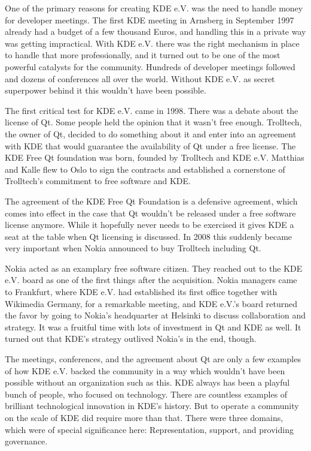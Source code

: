 One of the primary reasons for creating KDE e.V. was the need to handle money for developer meetings. The first KDE meeting in Arnsberg in September 1997 already had a budget of a few thousand Euros, and handling this in a private way was getting impractical. With KDE e.V. there was the right mechanism in place to handle that more professionally, and it turned out to be one of the most powerful catalysts for the community. Hundreds of developer meetings followed and dozens of conferences all over the world. Without KDE e.V. as secret superpower behind it this wouldn't have been possible.

The first critical test for KDE e.V. came in 1998. There was a debate about the license of Qt. Some people held the opinion that it wasn't free enough. Trolltech, the owner of Qt, decided to do something about it and enter into an agreement with KDE that would guarantee the availability of Qt under a free license. The KDE Free Qt foundation was born, founded by Trolltech and KDE e.V. Matthias and Kalle flew to Oslo to sign the contracts and established a cornerstone of Trolltech's commitment to free software and KDE.

The agreement of the KDE Free Qt Foundation is a defensive agreement, which comes into effect in the case that Qt wouldn't be released under a free software license anymore. While it hopefully never needs to be exercised it gives KDE a seat at the table when Qt licensing is discussed. In 2008 this suddenly became very important when Nokia announced to buy Trolltech including Qt.

Nokia acted as an examplary free software citizen. They reached out to the KDE e.V. board as one of the first things after the acquisition. Nokia managers came to Frankfurt, where KDE e.V. had established its first office together with Wikimedia Germany, for a remarkable meeting, and KDE e.V.'s board returned the favor by going to Nokia's headquarter at Helsinki to discuss collaboration and strategy. It was a fruitful time with lots of investment in Qt and KDE as well. It turned out that KDE's strategy outlived Nokia's in the end, though.

The meetings, conferences, and the agreement about Qt are only a few examples of how KDE e.V. backed the community in a way which wouldn't have been possible without an organization such as this. KDE always has been a playful bunch of people, who focused on technology. There are countless examples of brilliant technological innovation in KDE's history. But to operate a community on the scale of KDE did require more than that. There were three domains, which were of special significance here: Representation, support, and providing governance.

